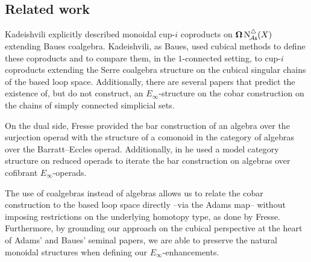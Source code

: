 \subsection*{Related work}

Kadeishvili \cite{kadeishvili1999coproducts, kadeishvili2003cupi} explicitly described monoidal cup-$i$ coproducts on $\operatorname{\mathbf{\Omega}} \operatorname{N^{\triangle}_{\!{\mathcal{A}\mathsf{s}}}}(X)$ extending Baues coalgebra.
Kadeishvili, as Baues, used cubical methods to define these coproducts and to compare them, in the $1$-connected setting, to cup-$i$ coproducts extending the Serre coalgebra structure on the cubical singular chains of the based loop space.
Additionally, there are several papers \cite{smirnov1990iterated, smith1994cobar, smith2000operads, kadeishvili1998iterating} that predict the existence of, but do not construct, an $E_\infty$-structure on the cobar construction on the chains of simply connected simplicial sets.

On the dual side, Fresse \cite{fresse2003hopf} provided the bar construction of an algebra over the surjection operad with the structure of a comonoid in the category of algebras over the Barratt--Eccles operad.
Additionally, in \cite{fresse2010bar} he used a model category structure on reduced operads \cite{berger2003modelcategory, hinich1997homologicalalgebra} to iterate the bar construction on algebras over cofibrant $E_\infty$-operads.

The use of coalgebras instead of algebras allows us to relate the cobar construction to the based loop space directly --via the Adams map-- without imposing restrictions on the underlying homotopy type, as done by Fresse.
Furthermore, by grounding our approach on the cubical perspective at the heart of Adams' and Baues' seminal papers, we are able to preserve the natural monoidal structures when defining our $E_\infty$-enhancements.
